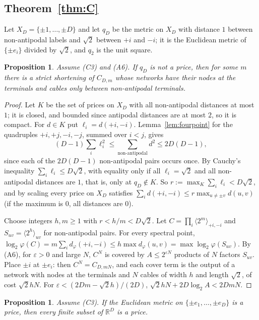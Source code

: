 \documentclass[11pt,a4paper]{article}
\newtheorem{proposition}[lemma]{Proposition}
\theoremstyle{definition}
\newcommand{\R}{\mathbb{R}}
\newcommand{\wire}[2]{\langle #1\rangle_{#2}}
\newcommand{\CS}{\textup{C3}}
\newcommand{\AS}{\textup{A6}}
\begin{document}
\subsection{Theorem~\ref{thm:C}}

Let $X_D=\{\pm1,\dots,\pm D\}$ and let $q_D$ be the metric on $X_D$ with distance
$1$ between non-antipodal labels and $\sqrt2$ between $+i$ and $-i$; it is the
Euclidean metric of $\{\pm e_i\}$ divided by $\sqrt2$, and $q_2$ is the unit
square.

\begin{proposition}\label{prop:extremal}
Assume (\CS) and (\AS). If $q_D$ is not a price, then for some $m$ there is a
strict shortening of $C_{D,m}$ whose networks have their nodes at the terminals
and cables only between non-antipodal terminals.
\end{proposition}

\begin{proof}
Let $K$ be the set of prices on $X_D$ with all non-antipodal distances at most
$1$; it is closed, and bounded since antipodal distances are at most $2$, so it
is compact. For $d\in K$ put $\ell_i=d(+i,-i)$. Lemma~\ref{lem:fourpoint} for the
quadruples $+i,+j,-i,-j$, summed over $i<j$, gives
\[
(D-1)\sum_i\ell_i^2\le\sum_{\text{non-antipodal}}d^2\le2D(D-1),
\]
since each of the $2D(D-1)$ non-antipodal pairs occurs once. By Cauchy's
inequality $\sum_i\ell_i\le D\sqrt2$, with equality only if all $\ell_i=\sqrt2$
and all non-antipodal distances are $1$, that is, only at $q_D\notin K$. So
$r:=\max_K\sum_i\ell_i<D\sqrt2$, and by scaling every price on $X_D$ satisfies
$\sum_id(+i,-i)\le r\max_{u\ne\pm v}d(u,v)$ (if the maximum is $0$, all
distances are $0$).

Choose integers $h,m\ge1$ with $r<h/m<D\sqrt2$. Let
$C=\prod_i\wire{2^m}{+i,-i}$ and $S_{uv}=\wire{2^h}{uv}$ for non-antipodal pairs.
For every spectral point, $\log_2\varphi(C)=m\sum_id_\varphi(+i,-i)\le
h\max d_\varphi(u,v)=\max\log_2\varphi(S_{uv})$. By (\AS), for $\varepsilon>0$ and
large $N$, $C^N$ is covered by $A\le2^{\varepsilon N}$ products of $N$ factors
$S_{uv}$. Place $\pm i$ at $\pm e_i$: then $C^N=C_{D,mN}$, and each cover term is
the output of a network with nodes at the terminals and $N$ cables of width $h$
and length $\sqrt2$, of cost $\sqrt2hN$. For
$\varepsilon<(2Dm-\sqrt2h)/(2D)$, $\sqrt2hN+2D\log_2A<2DmN$.
\end{proof}

\begin{proposition}\label{prop:rigidity}
Assume (\CS). If the Euclidean metric on $\{\pm e_1,\dots,\pm e_D\}$ is a price,
then every finite subset of $\R^D$ is a price.
\end{proposition}
\end{document}
